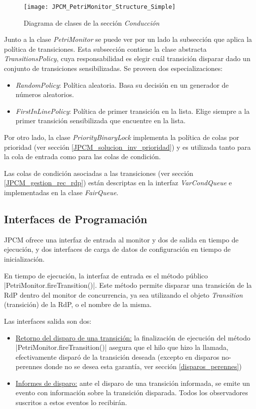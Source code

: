 \begin{figure}[H]
  \hspace*{-2.5cm}
  \texttt{[image: JPCM\_PetriMonitor\_Structure\_Simple]}
  \caption{Diagrama de clases de la sección \textit{Conducción}}
  \label{fig:JPCM_PetriMonitor_Structure}
\end{figure}

Junto a la clase \textit{PetriMonitor} se puede ver por un lado la subsección
que aplica la política de transiciones. Esta subsección contiene la clase
abstracta \textit{TransitionsPolicy}, cuya responsabilidad es elegir cuál
transición disparar dado un conjunto de transiciones sensibilizadas.
Se proveen dos especializaciones: 
\begin{itemize}
  \item \textit{RandomPolicy}: Política aleatoria. Basa su decisión en un
  generador de números aleatorios.
  \item \textit{FirstInLinePolicy}: Política de primer transición en la lista.
  Elige siempre a la primer transición sensibilizada que encuentre en la lista.
\end{itemize}

Por otro lado, la clase \textit{PriorityBinaryLock} implementa la política de
colas por prioridad (ver sección \ref{JPCM_solucion_inv_prioridad}) y es
utilizada tanto para la cola de entrada como para las colas de condición.

Las colas de condición asociadas a las transiciones (ver sección
\ref{JPCM_gestion_rec_rdp}) están descriptas en la interfaz
\textit{VarCondQueue} e implementadas en la clase \textit{FairQueue}.


\subsection{Interfaces de Programación}

JPCM ofrece una interfaz de entrada al monitor y dos de salida en tiempo de
ejecución, y dos interfaces de carga de datos de configuración en tiempo de
inicialización.

En tiempo de ejecución, la interfaz de entrada es el método público 
|PetriMonitor.fireTransition()|. Este método permite disparar una
transición de la RdP dentro del monitor de concurrencia, ya sea utilizando el
objeto \textit{Transition} (transición) de la RdP, o el nombre de la misma.

Las interfaces salida son dos:
\begin{itemize}
  \item \underline{Retorno del disparo de una transición:} la finalización de
  ejecución del método |PetriMonitor.fireTransition()| asegura que el
  hilo que hizo la llamada, efectivamente disparó de la transición deseada
  (excepto en disparos no-perennes donde no se desea esta garantía, ver sección
  \ref{disparos_perennes})
  \item \underline{Informes de disparo:} ante el disparo de una
  transición informada, se emite un evento con información sobre la transición
  disparada. Todos los observadores suscritos a estos eventos lo recibirán.
\end{itemize}

